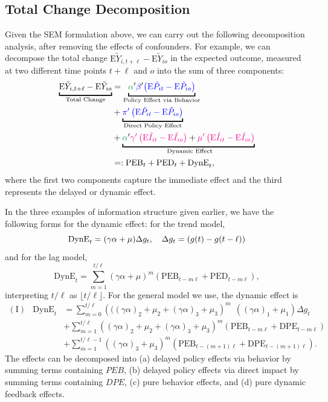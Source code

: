 \documentclass[11pt,reqno,letter]{amsart}
\theoremstyle{definition}
\newcommand{\Ep}{{\mathrm{E}}}
\def\bcolor{\color{ForestGreen}}
\def\pcolor{\color{blue}}
\def\icolor{\color{magenta}}
\begin{document}
\subsection{Total Change Decomposition}
Given the SEM formulation above, we can carry out the following decomposition analysis, after removing the effects of confounders. For example,
we can decompose the total change $\Ep \tilde Y_{i,t+\ell} - \Ep \tilde Y_{io}$ in the expected outcome, measured at two different time points $t+\ell$ and $o$ into the sum of three components:
\begin{equation} \label{eqn:DC}
  \begin{aligned}
\underbracket{\Ep \tilde Y_{i,t+\ell} - \Ep \tilde Y_{io}}_{\text{Total Change}}& =
{\underbracket{{\bcolor\alpha}' {\pcolor\beta}' {\pcolor\left( \Ep \tilde P_{it} - \Ep \tilde P_{io} \right)}}_{\text{Policy Effect via Behavior}}} \\
& +    {\underbracket{\pcolor\pi' \left( \Ep \tilde P_{it} - \Ep \tilde P_{io} \right)}_{\text{Direct Policy Effect}} } \\
& +  {\underbracket{{\bcolor\alpha}' {\icolor{\gamma}'  \left( \Ep \tilde I_{it} - \Ep \tilde I_{io} \right)}+ {\icolor{\mu}'  \left( \Ep \tilde I_{it} - \Ep \tilde I_{io} \right)}}_{\text{ Dynamic Effect}}} \\
& =:   \mathrm{PEB}_t + \mathrm{PED}_t + \mathrm{DynE}_t,
  \end{aligned}
\end{equation}
where the first two components capture the immediate effect and the third represents the delayed or dynamic effect.

In the three examples of information structure given earlier, we have the following forms for the dynamic effect: for the trend model,
$$
   \mathrm{DynE}_t   = (\gamma \alpha + \mu) \Delta g_t, \quad  \Delta g_t = (g(t) - g(t-\ell))\\
$$
and for the lag model, $$
   \mathrm{DynE}_t  =    \sum_{m=1}^{t/\ell} \left( \gamma \alpha+ \mu   \right)^m (\mathrm{PEB}_{t-m \ell }  +\mathrm{PED}_{t-m \ell } ),
 $$
  interpreting $t/\ell$ as $\lfloor t/\ell \rfloor$.
 For the general model we use, the dynamic effect is
 $$
 \begin{array}{lll}
(\mathrm{I})    & \mathrm{DynE}_t  & = \sum_{m=0}^{t/\ell} \left(( (\gamma \alpha)_2 + \mu_2+  (\gamma \alpha)_3+ \mu_3    \right)^m  \ \ ( (\gamma \alpha)_{1} + \mu_1) \Delta g_t  \\
& & +   \sum_{m=1}^{t/\ell} \left( (\gamma \alpha)_2 + \mu_2+  (\gamma \alpha)_3+ \mu_3    \right)^m \left(\mathrm{PEB}_{t-m \ell } +  \mathrm{DPE}_{t- m \ell} \right)
  \\
 &&  + \sum_{m=1}^{t/\ell-1} \left( (\gamma \alpha)_3 + \mu_3    \right)^m \left (\mathrm{PEB}_{t-(m +1) \ell } +  \mathrm{DPE}_{t- (m+1) \ell}  \right).
 \end{array}
 $$
 The effects can be decomposed into (a) delayed policy effects via behavior by
summing terms containing $PEB$, (b) delayed policy effects via direct impact
by summing terms containing $DPE$,   (c) pure behavior effects, and (d)  pure dynamic feedback effects.
\end{document}
